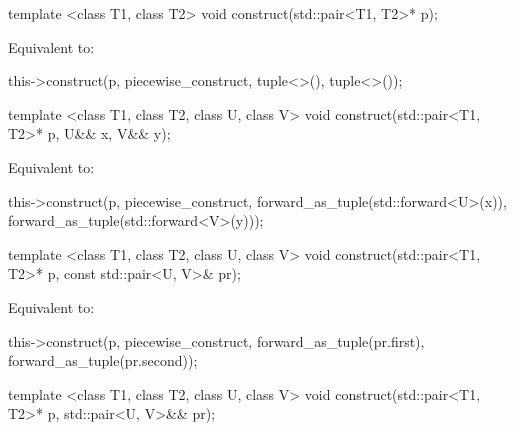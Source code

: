 %
%
\begin{itemdecl}
template <class T1, class T2>
  void construct(std::pair<T1, T2>* p);
\end{itemdecl}

\begin{itemdescr}
\pnum
\effects
Equivalent to:
\begin{codeblock}
this->construct(p, piecewise_construct, tuple<>(), tuple<>());
\end{codeblock}
\end{itemdescr}

%
%
\begin{itemdecl}
template <class T1, class T2, class U, class V>
  void construct(std::pair<T1, T2>* p, U&& x, V&& y);
\end{itemdecl}

\begin{itemdescr}
\pnum
\effects
Equivalent to:
\begin{codeblock}
this->construct(p, piecewise_construct,
                forward_as_tuple(std::forward<U>(x)),
                forward_as_tuple(std::forward<V>(y)));
\end{codeblock}
\end{itemdescr}

%
%
\begin{itemdecl}
template <class T1, class T2, class U, class V>
  void construct(std::pair<T1, T2>* p, const std::pair<U, V>& pr);
\end{itemdecl}

\begin{itemdescr}
\pnum
\effects
Equivalent to:
\begin{codeblock}
this->construct(p, piecewise_construct,
                forward_as_tuple(pr.first),
                forward_as_tuple(pr.second));
\end{codeblock}
\end{itemdescr}

%
%
\begin{itemdecl}
template <class T1, class T2, class U, class V>
  void construct(std::pair<T1, T2>* p, std::pair<U, V>&& pr);
\end{itemdecl}

